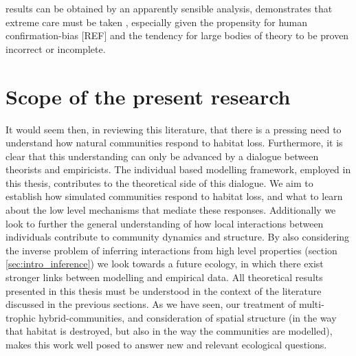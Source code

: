 results can be obtained by an apparently sensible analysis, demonstrates that extreme care must be taken , especially given the propensity for human confirmation-bias [REF] and the tendency for large bodies of theory to be proven incorrect or incomplete.     
%

\section{Scope of the present research}
\label{sec:scope}

It would seem then, in reviewing this literature, that there is a pressing need to understand how natural communities respond to habitat loss. Furthermore, it is clear that this understanding can only be advanced by a dialogue between theorists and empiricists. The individual based modelling framework, employed in this thesis, contributes to the theoretical side of this dialogue. We aim to establish how simulated communities respond to habitat loss, and what to learn about the low level mechanisms that mediate these responses. Additionally we look to further the general understanding of how local interactions between individuals contribute to community dynamics and structure. By also considering the inverse problem of inferring interactions from high level properties (section \ref{sec:intro_inference}) we look towards a future ecology, in which there exist stronger links between modelling and empirical data. All theoretical results presented in this thesis must be understood in the context of the literature discussed in the previous sections. As we have seen, our treatment of multi-trophic hybrid-communities, and consideration of spatial structure (in the way that habitat is destroyed, but also in the way the communities are modelled), makes this work well posed to answer new and relevant ecological questions.

